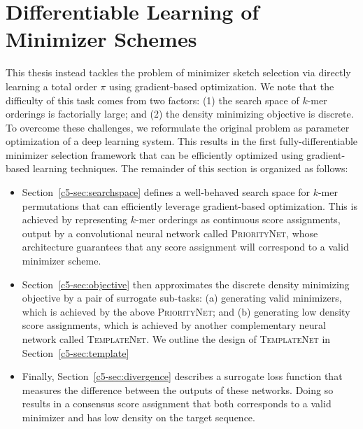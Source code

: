\label{app:msd}
\section{Differentiable Learning of Minimizer Schemes}

This thesis instead tackles the problem of minimizer sketch selection via directly learning a total order $\pi$ using gradient-based optimization. We note that the difficulty of this task comes from two factors: (1) the search space of $k$-mer orderings is factorially large; and (2) the density minimizing objective is discrete. To overcome these challenges, we reformulate the original problem as parameter optimization of a deep learning system. This results in the first {fully-differentiable} minimizer selection framework that can be efficiently optimized using gradient-based learning techniques. The remainder of this section is organized as follows:

\begin{itemize}
    \item Section~\ref{c5-sec:searchspace} defines a well-behaved search space for $k$-mer permutations that can efficiently leverage gradient-based optimization. This is achieved by representing $k$-mer orderings as continuous score assignments, output by a convolutional neural network called \textsc{PriorityNet}, whose architecture guarantees that any score assignment will correspond to a valid minimizer scheme.
    \item Section~\ref{c5-sec:objective} then approximates the discrete density minimizing objective by a pair of surrogate sub-tasks: (a) generating valid minimizers, which is achieved by the above \textsc{PriorityNet}; and (b) generating low density score assignments, which is achieved by another complementary neural network called \textsc{TemplateNet}. We outline the design of \textsc{TemplateNet} in Section~\ref{c5-sec:template}
    \item 
    Finally,  Section~\ref{c5-sec:divergence} describes a surrogate loss function that measures the difference between the outputs of these networks. Doing so results in a consensus score assignment that both corresponds to a valid minimizer and has low density on the target sequence. 
\end{itemize}

